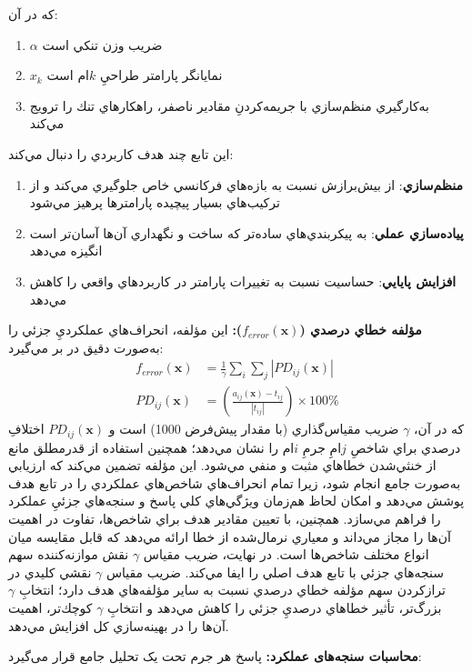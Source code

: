كه در آن:
\begin{enumerate}
    \item $\alpha$ ضريب وزن تنكي است
    \item $x_k$ نمايانگر پارامتر طراحيِ $k$ام است
    \item به‌كارگيري منظم‌سازي  با جريمه‌كردنِ مقادير ناصفر، راهكارهاي تنك را ترويج مي‌كند
\end{enumerate}
اين تابع چند هدف كاربردي را دنبال مي‌كند:
\begin{enumerate}
    \item \textbf{منظم‌سازي}: از بيش‌برازش نسبت به بازه‌هاي فركانسي خاص جلوگيري مي‌كند و از تركيب‌هاي بسيار پيچيده پارامترها پرهيز مي‌شود
    \item \textbf{پياده‌سازي عملي}: به پيكربندي‌هاي ساده‌تر  كه ساخت و نگهداري آن‌ها آسان‌تر است انگيزه مي‌دهد
    \item \textbf{افزايش پايايي}: حساسيت نسبت به تغييرات پارامتر در كاربردهاي واقعي را كاهش مي‌دهد
\end{enumerate}
\textbf{مؤلفه خطاي درصدي ($f_{error}(\mathbf{x})$):} اين مؤلفه، انحراف‌هاي عملكرديِ جزئي را به‌صورت دقيق در بر مي‌گيرد:
\begin{align}\label{Eq.percentage_error_detailed}
f_{error}(\mathbf{x}) &= \frac{1}{\gamma} \sum_{i} \sum_{j} \left| PD_{ij}(\mathbf{x}) \right|\\
PD_{ij}(\mathbf{x}) &= \left( \frac{a_{ij}(\mathbf{x}) - t_{ij}}{|t_{ij}|} \right) \times 100\%
\end{align}
كه در آن، $\gamma$ ضريب مقياس‌گذاري (با مقدار پيش‌فرض 1000) است و $PD_{ij}(\mathbf{x})$ اختلافِ درصدي براي شاخصِ $j$امِ جرمِ $i$ام را نشان مي‌دهد؛ همچنين استفاده از قدرمطلق مانع از خنثي‌شدن خطاهاي مثبت و منفي مي‌شود. اين مؤلفه تضمين مي‌كند كه ارزيابي به‌صورت جامع انجام شود، زيرا تمام انحراف‌هاي شاخص‌هاي عملكردي را در تابع هدف پوشش مي‌دهد و امكان لحاظ هم‌زمان ويژگي‌هاي كلي پاسخ و سنجه‌هاي جزئيِ عملكرد را فراهم مي‌سازد. همچنين، با تعيين مقادير هدف براي شاخص‌ها، تفاوت در اهميت آن‌ها را مجاز مي‌داند و معياري نرمال‌شده از خطا ارائه مي‌دهد كه قابل مقايسه ميان انواع مختلف شاخص‌ها است. در نهايت، ضريب مقياس $\gamma$ نقش موازنه‌كننده سهم سنجه‌هاي جزئي با تابع هدف اصلي را ايفا مي‌كند.
ضريب مقياس $\gamma$ نقشي كليدي در ترازكردن سهم مؤلفه خطاي درصدي نسبت به ساير مؤلفه‌هاي هدف دارد؛ انتخابِ $\gamma$ بزرگ‌تر، تأثير خطاهاي درصديِ جزئي را كاهش مي‌دهد و انتخابِ $\gamma$ كوچك‌تر، اهميت آن‌ها را در بهينه‌سازي كل افزايش مي‌دهد.

\textbf{محاسبات سنجه‌های عملکرد:} پاسخ هر جرم تحت یک تحلیل جامع قرار می‌گیرد:


